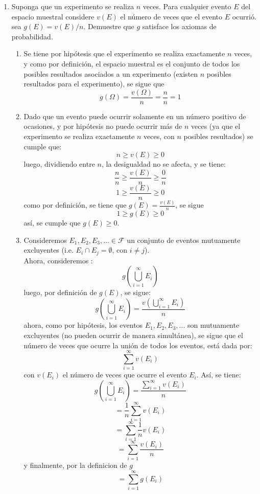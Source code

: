 \documentclass[12pt,a4paper]{report}
\begin{document}
\begin{enumerate}
   \item {
   	Suponga que un experimento se realiza $n$ veces. Para cualquier evento $E$ del
	espacio muestral considere $v(E)$ el número de veces que el evento $E$ ocurrió.
	sea $g(E)=v(E)/n$. Demuestre que $g$ satisface los axiomas de probabilidad.\\
	\begin{enumerate}[label=\Roman*.]
	\item{
		Se tiene por hipótesis que el experimento se realiza exactamente $n$
		veces, y como por definición, el espacio muestral es el conjunto de
		todos los posibles resultados asociados a un experimento (existen $n$ posibles
		resultados para el experimento), se sigue que
			$$ g(\Omega) = \frac{v(\Omega)}{n} = \frac{n}{n} = 1$$
	}
	\item{
		Dado que un evento puede ocurrir solamente en un número positivo de ocasiones,
		y por hipótesis no puede ocurrir más de $n$ veces (ya que el experimento se
		realiza exactamente $n$ veces, con $n$ posibles resultados) se cumple que:
			$$ n \geq v(E) \geq 0$$
		luego, dividiendo entre $n$, la desigualdad no se afecta, y se tiene:
			$$ \frac{n}{n} \geq \frac{v(E)}{n} \geq \frac{0}{n}$$
			$$ 1 \geq \frac{v(E)}{n} \geq 0$$
		como por definición, se tiene que $g(E) = \frac{v(E)}{n}$, se sigue
			$$ 1 \geq g(E) \geq 0$$
		así, se cumple que $g(E) \geq 0$.
	}
	\item{
		Consideremos $E_1, E_2, E_3, ... \in \mathcal{F}$ un conjunto de eventos
		mutuamente excluyentes (i.e. $E_i \cap E_j = \emptyset$, con $i \neq j$).\\

		Ahora, consideremos :
			$$g\left( \bigcup_{i=1}^{\infty} E_{i} \right)$$
		luego, por definición de $g(E)$, se sigue:
			$$g\left( \bigcup_{i=1}^{\infty} E_{i} \right) =
				\frac{ v\left( \bigcup_{i=1}^{\infty} E_{i} \right)  }{ n }$$
		ahora, como por hipótesis, los eventos $E_1, E_2, E_3, ...$ son mutuamente
		excluyentes (no pueden ocurrir de manera simultánea), se sigue que el
		número de veces que ocurre la unión de todos los eventos, está dada por:
			$$\sum_{i=1}^{\infty} v(E_{i})$$
		con $v(E_i)$ el número de veces que ocurre el evento $E_i$. Así, se tiene:
			$$ g\left( \bigcup_{i=1}^{\infty} E_{i} \right) =
			\frac{ \sum_{i=1}^{\infty} v(E_{i})  }{ n } $$
			$$ = \frac{1}{n} \sum_{i=1}^{\infty} v(E_{i}) $$
			$$ = \sum_{i=1}^{\infty} \frac{1}{n} v(E_{i}) $$
			$$ = \sum_{i=1}^{\infty} \frac{v(E_{i})}{n}  $$
		y finalmente, por la definicion de $g$
			$$ = \sum_{i=1}^{\infty} g(E_i)  $$

}
\end{enumerate}}
\end{enumerate}
\end{document}
